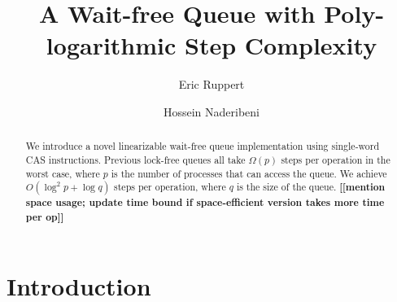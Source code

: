 \documentclass[acmsmall,nonacm,anonymous]{acmart}
\renewcommand{\bf}[1]{\textbf{#1}}
\newcommand{\here}[1]{\bf{[[#1]]}}
\begin{document}
\title{A Wait-free Queue with Poly-logarithmic Step Complexity}


\author{Eric Ruppert}

\author{Hossein Naderibeni}


\begin{abstract}
We introduce a novel linearizable wait-free queue implementation using single-word 
CAS instructions.
Previous lock-free queues all take $\Omega(p)$ steps per operation in the worst case, 
where $p$ is the number of processes that can access the queue.
We achieve $O(\log^2 p +\log q)$ steps per operation, where $q$ is the size of the queue.
\here{mention space usage; update time bound if space-efficient version takes more time per op}
\end{abstract}



\maketitle

\section{Introduction}
\end{document}
